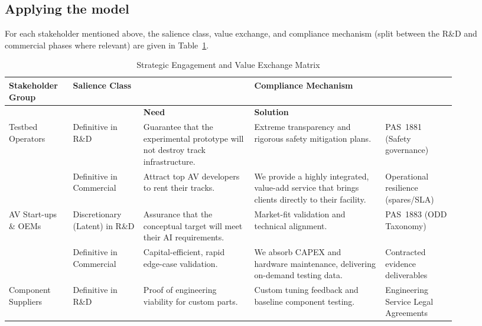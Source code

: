 \documentclass[11pt, a4paper]{report}
\numberwithin{equation}{section}
\begin{document}
\begin{refsection}
\subsection{Applying the model}

For each stakeholder mentioned above, the salience class, value exchange, and compliance mechanism (split between the R\&D and commercial phases where relevant) are given in Table~\ref{tab:strategic_engagement_matrix}.

\begin{table}[htbp]
\centering
\small
\setlength{\tabcolsep}{3pt}
\renewcommand{\arraystretch}{1.15}
\caption{Strategic Engagement and Value Exchange Matrix}\label{tab:strategic_engagement_matrix}
\begin{tabular}{|>{\raggedright\arraybackslash}p{0.12\linewidth}|>{\raggedright\arraybackslash}p{0.14\linewidth}|>{\raggedright\arraybackslash}p{0.22\linewidth}|>{\raggedright\arraybackslash}p{0.26\linewidth}|>{\raggedright\arraybackslash}p{0.14\linewidth}|}
\hline
\textbf{Stakeholder Group} & \textbf{Salience Class} & \multicolumn{2}{c|}{\textbf{The Value Exchange}} & \textbf{Compliance Mechanism} \\
\cline{3-4}
 & & \textbf{Need} & \textbf{Solution} & \\
\hline
Testbed Operators & Definitive in R\&D & Guarantee that the experimental prototype will not destroy track infrastructure. & Extreme transparency and rigorous safety mitigation plans. & PAS~1881 \cite{pas1881} (Safety governance) \\
\cline{2-5}
 & Definitive in Commercial & Attract top AV developers to rent their tracks. & We provide a highly integrated, value-add service that brings clients directly to their facility. & Operational resilience (spares/SLA) \\
\hline
AV Start-ups \& OEMs & Discretionary (Latent) in R\&D & Assurance that the conceptual target will meet their AI requirements. & Market-fit validation and technical alignment. & PAS~1883 \cite{pas1883} (ODD Taxonomy) \\
\cline{2-5}
 & Definitive in Commercial & Capital-efficient, rapid edge-case validation. & We absorb CAPEX and hardware maintenance, delivering on-demand testing data. & Contracted evidence deliverables \\
\hline
Component Suppliers & Definitive in R\&D & Proof of engineering viability for custom parts. & Custom tuning feedback and baseline component testing. & Engineering Service Legal Agreements \\

\end{tabular}
\end{table}
\end{refsection}
\end{document}
